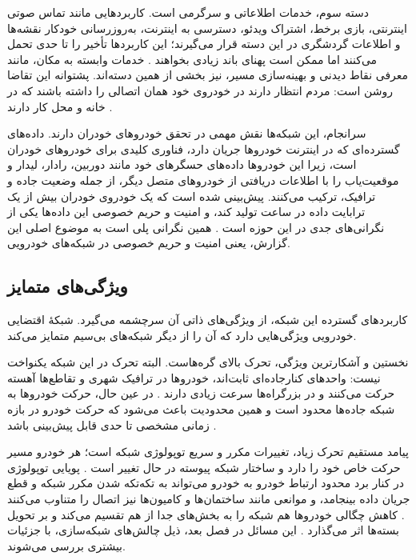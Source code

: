 \documentclass[12pt,a4paper]{article}
\begin{document}
دسته سوم، خدمات اطلاعاتی و سرگرمی است. کاربرد‌هایی مانند تماس صوتی اینترنتی، بازی برخط، اشتراک ویدئو، دسترسی به اینترنت، به‌روزرسانی خودکار نقشه‌ها و اطلاعات گردشگری در این دسته قرار می‌گیرند؛ این کاربرد‌ها تأخیر را تا حدی تحمل می‌کنند اما ممکن است پهنای باند زیادی بخواهند \cite{hozouriOverviewVANETVehicular2023}. خدمات وابسته به مکان، مانند معرفی نقاط دیدنی و بهینه‌سازی مسیر، نیز بخشی از همین دسته‌اند. پشتوانه این تقاضا روشن است: مردم انتظار دارند در خودروی خود همان اتصالی را داشته باشند که در خانه و محل کار دارند \cite{luConnectedVehiclesSolutions2014}.

سرانجام، این شبکه‌ها نقش مهمی در تحقق خودرو‌های خودران دارند. داده‌های گسترده‌ای که در اینترنت خودرو‌ها جریان دارد، فناوری کلیدی برای خودرو‌های خودران است، زیرا این خودرو‌ها داده‌های حسگر‌های خود مانند دوربین، رادار، لیدار و موقعیت‌یاب را با اطلاعات دریافتی از خودرو‌های متصل دیگر، از جمله وضعیت جاده و ترافیک، ترکیب می‌کنند. پیش‌بینی شده است که یک خودروی خودران بیش از یک ترابایت داده در ساعت تولید کند، و امنیت و حریم خصوصی این داده‌ها یکی از نگرانی‌های جدی در این حوزه است \cite{xuInternetVehiclesBig2018}. همین نگرانی پلی است به موضوع اصلی این گزارش، یعنی امنیت و حریم خصوصی در شبکه‌های خودرویی.

\subsection{ویژگی‌های متمایز}

کاربرد‌های گسترده این شبکه، از ویژگی‌های ذاتی آن سرچشمه می‌گیرد. شبکهٔ اقتضایی خودرویی ویژگی‌هایی دارد که آن را از دیگر شبکه‌های بی‌سیم متمایز می‌کند.

نخستین و آشکارترین ویژگی، تحرک بالای گره‌هاست. البته تحرک در این شبکه یکنواخت نیست: واحد‌های کنارجاده‌ای ثابت‌اند، خودرو‌ها در ترافیک شهری و تقاطع‌ها آهسته حرکت می‌کنند و در بزرگراه‌ها سرعت زیادی دارند \cite{hozouriOverviewVANETVehicular2023}. در عین حال، حرکت خودرو‌ها به شبکه جاده‌ها محدود است و همین محدودیت باعث می‌شود که حرکت خودرو در بازه زمانی مشخصی تا حدی قابل پیش‌بینی باشد \cite{hozouriOverviewVANETVehicular2023,luConnectedVehiclesSolutions2014}.

پیامد مستقیم تحرک زیاد، تغییرات مکرر و سریع توپولوژی شبکه است؛ هر خودرو مسیر حرکت خاص خود را دارد و ساختار شبکه پیوسته در حال تغییر است \cite{luConnectedVehiclesSolutions2014}. پویایی توپولوژی در کنار برد محدود ارتباط خودرو به خودرو می‌تواند به تکه‌تکه شدن مکرر شبکه و قطع جریان داده بینجامد، و موانعی مانند ساختمان‌ها و کامیون‌ها نیز اتصال را متناوب می‌کنند \cite{luConnectedVehiclesSolutions2014}. کاهش چگالی خودرو‌ها هم شبکه را به بخش‌های جدا از هم تقسیم می‌کند و بر تحویل بسته‌ها اثر می‌گذارد \cite{hozouriOverviewVANETVehicular2023}. این مسائل در فصل بعد، ذیل چالش‌های شبکه‌سازی، با جزئیات بیشتری بررسی می‌شوند.
\end{document}
